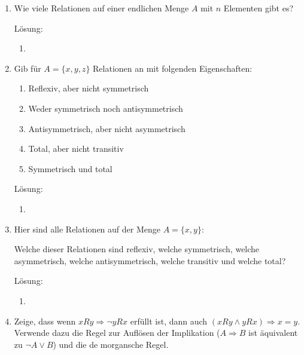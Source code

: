 \documentclass[../main.tex]{subfiles}
\begin{document}
\begin{enumerate}
	\item Wie viele Relationen auf einer endlichen Menge \( A \) mit \( n \) Elementen gibt es?

	      Lösung:
	      \begin{enumerate}
		      \item
	      \end{enumerate}
	\item Gib für \( A = \{x, y, z\} \) Relationen an mit folgenden Eigenschaften:
	      \begin{enumerate}
		      \item Reflexiv, aber nicht symmetrisch
		      \item Weder symmetrisch noch antisymmetrisch
		      \item Antisymmetrisch, aber nicht asymmetrisch
		      \item Total, aber nicht transitiv
		      \item Symmetrisch und total
	      \end{enumerate}

	      Lösung:
	      \begin{enumerate}
		      \item
	      \end{enumerate}
	\item Hier sind alle Relationen auf der Menge \( A = \{ x, y \} \):


	      Welche dieser Relationen sind reflexiv, welche symmetrisch, welche asymmetrisch,
	      welche antisymmetrisch, welche transitiv und welche total?

	      Lösung:
	      \begin{enumerate}
		      \item
	      \end{enumerate}
	\item
	      Zeige, dass wenn \( xRy \Rightarrow \neg yRx \) erfüllt ist, dann auch
	      \( (xRy \land yRx) \Rightarrow x = y \).
	      Verwende dazu die Regel zur Auflösen der Implikation (\( A \Rightarrow B  \) ist äquivalent
	      zu \( \neg A \lor B \)) und die de morgansche Regel.


\end{enumerate}
\end{document}
